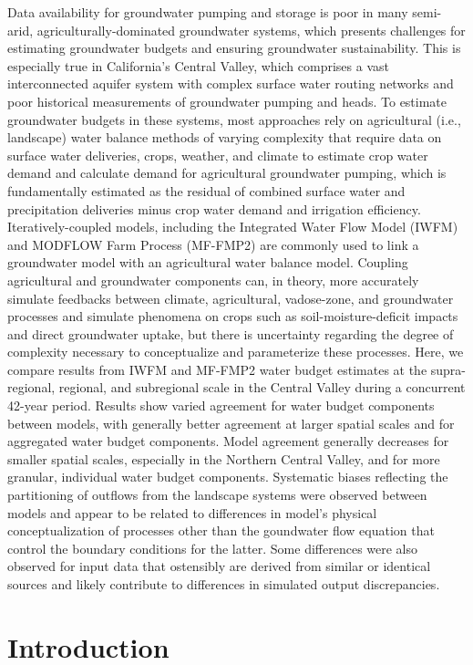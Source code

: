 \noindent Data availability for groundwater pumping and storage is poor in many semi-arid, agriculturally-dominated groundwater systems, which presents challenges for estimating groundwater budgets and ensuring groundwater sustainability. This is especially true in California's Central Valley, which comprises a vast interconnected aquifer system with complex surface water routing networks and poor historical measurements of groundwater pumping and heads. To estimate groundwater budgets in these systems, most approaches rely on agricultural (i.e., landscape) water balance methods of varying complexity that require data on surface water deliveries, crops, weather, and climate to estimate crop water demand and calculate demand for agricultural groundwater pumping, which is fundamentally estimated as the residual of combined surface water and precipitation deliveries minus crop water demand and irrigation efficiency. Iteratively-coupled models, including the Integrated Water Flow Model (IWFM) and MODFLOW Farm Process (MF-FMP2) are commonly used to link a groundwater model with an agricultural water balance model. Coupling agricultural and groundwater components can, in theory, more accurately simulate feedbacks between climate, agricultural, vadose-zone, and groundwater processes and simulate phenomena on crops such as soil-moisture-deficit impacts and direct groundwater uptake, but there is uncertainty regarding the degree of complexity necessary to conceptualize and parameterize these processes. Here, we compare results from IWFM and MF-FMP2 water budget estimates at the supra-regional, regional, and subregional scale in the Central Valley during a concurrent 42-year period. Results show varied agreement for water budget components between models, with generally better agreement at larger spatial scales and for aggregated water budget components. Model agreement generally decreases for smaller spatial scales, especially in the Northern Central Valley, and for more granular, individual water budget components. Systematic biases reflecting the partitioning of outflows from the landscape systems were observed between models and appear to be related to differences in model’s physical conceptualization of processes other than the goundwater flow equation that control the boundary conditions for the latter. Some differences were also observed for input data that ostensibly are derived from similar or identical sources and likely contribute to differences in simulated output discrepancies.

\section{Introduction}

